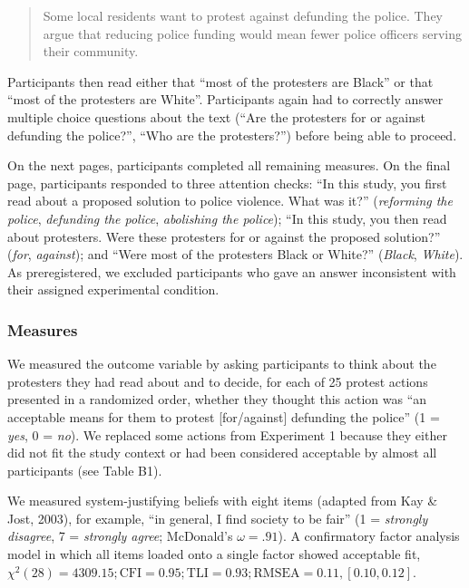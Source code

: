 \documentclass[12pt, letterpaper]{article}
\begin{document}
\begin{quote}
Some local residents want to protest against defunding the police. They
argue that reducing police funding would mean fewer police officers
serving their community.
\end{quote}

\noindent Participants then read either that ``most of the protesters
are Black'' or that ``most of the protesters are White''. Participants
again had to correctly answer multiple choice questions about the text
(``Are the protesters for or against defunding the police?'', ``Who are
the protesters?'') before being able to proceed.

On the next pages, participants completed all remaining measures. On the
final page, participants responded to three attention checks: ``In this
study, you first read about a proposed solution to police violence. What
was it?'' (\emph{reforming the police}, \emph{defunding the police},
\emph{abolishing the police}); ``In this study, you then read about
protesters. Were these protesters for or against the proposed
solution?'' (\emph{for}, \emph{against}); and ``Were most of the
protesters Black or White?'' (\emph{Black}, \emph{White}). As
preregistered, we excluded participants who gave an answer inconsistent
with their assigned experimental condition.

\hypertarget{measures-1}{%
\subsubsection{Measures}\label{measures-1}}

We measured the outcome variable by asking participants to think about
the protesters they had read about and to decide, for each of 25 protest
actions presented in a randomized order, whether they thought this
action was ``an acceptable means for them to protest {[}for/against{]}
defunding the police'' (1 = \emph{yes}, 0 = \emph{no}). We replaced some
actions from Experiment 1 because they either did not fit the study
context or had been considered acceptable by almost all participants
(see Table B1).

We measured system-justifying beliefs with eight items (adapted from Kay
\& Jost, 2003), for example, ``in general, I find society to be fair''
(1 = \emph{strongly disagree}, 7 = \emph{strongly agree}; McDonald's
\(\omega = .91\)). A confirmatory factor analysis model in which all
items loaded onto a single factor showed acceptable fit,
\(\chi^2 (28) = 4309.15; \text{CFI} = 0.95; \text{TLI} = 0.93; \text{RMSEA} = 0.11, [0.10, 0.12]\).
\end{document}
